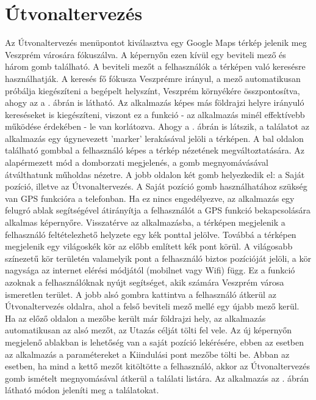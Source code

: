 \section {Útvonaltervezés}
\label {utvonalterv}
Az Útvonaltervezés menüpontot kiválasztva egy Google Maps térkép jelenik meg Veszprém városára fókuszálva.
A képernyőn ezen kívül egy beviteli mező és három gomb található.
A beviteli mezőt a felhasználók a térképen való keresésre használhatják.
A keresés fő fókusza Veszprémre irányul, a mező automatikusan próbálja kiegészíteni a begépelt helyszínt, Veszprém környékére összpontosítva, ahogy az a . ábrán is látható.
Az alkalmazás képes más földrajzi helyre irányuló kereséseket is kiegészíteni, viszont ez a funkció - az alkalmazás minél effektívebb működése érdekében - le van korlátozva.
Ahogy a . ábrán is látszik, a találatot az alkalmazás egy úgynevezett 'marker' lerakásával jelöli a térképen.
A bal oldalon található gombbal a felhasználó képes a térkép nézetének megváltoztatására.
Az alapérmezett mód a domborzati megjelenés, a gomb megnyomávásával átválthatunk műholdas nézetre.
A jobb oldalon két gomb helyezkedik el: a Saját pozíció, illetve az Útvonaltervezés.
A Saját pozíció gomb használhatához szükség van GPS funkcióra a telefonban.
Ha ez nincs engedélyezve, az alkalmazás egy felugró ablak segítségével átirányítja a felhasználót a GPS funkció bekapcsolására alkalmas képernyőre.
Visszatérve az alkalmazásba, a térképen megjelenik a felhasználó feltételezhető helyzete egy kék ponttal jelölve.
Továbbá a térképen megjelenik egy világoskék kör az előbb említett kék pont körül.
A világosabb színezetű kör területén valamelyik pont a felhasználó biztos pozícióját jelöli, a kör nagysága az internet elérési módjától (mobilnet vagy Wifi) függ.
Ez a funkció azoknak a felhasználóknak nyújt segítséget, akik számára Veszprém városa ismeretlen terület.
A jobb alsó gombra kattintva a felhasználó átkerül az Útvonaltervezés oldalra, ahol a felső beviteli mező mellé egy újabb mező kerül.
Ha az előző oldalon a mezőbe került már földrajzi hely, az alkalmazás automatikusan az alsó mezőt, az Utazás célját tölti fel vele.
Az új képernyőn megjelenő ablakban is lehetőség van a saját pozíció lekérésére, ebben az esetben az alkalmazás a paramétereket a Kiindulási pont mezőbe tölti be.
Abban az esetben, ha mind a kettő mezőt kitöltötte a felhasználó, akkor az Útvonaltervezés gomb ismételt megnyomásával átkerül a találati listára.
Az alkalmazás az . ábrán látható módon jeleníti meg a találatokat.
